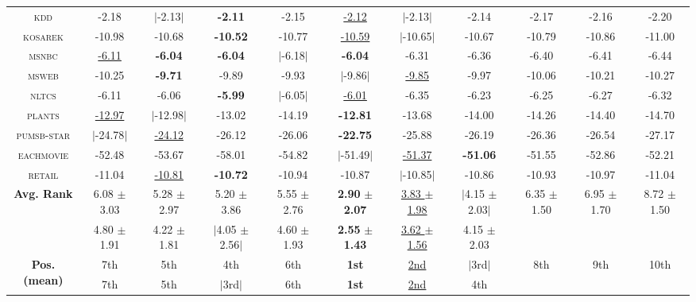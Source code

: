 \documentclass[14pt]{ffslides}
\newenvironment{vhcenterb}{\vspace*{\fill}\begin{center}}{\end{center}\vspace*{\fill}}
\begin{document}
\begin{vhcenterb}
{\begin{tabular}{c|ccccc|ccccc}
    \textsc{kdd       } & -2.18 & $|$-2.13$|$ & \textbf{-2.11} & -2.15 & \underline{-2.12} & $|$-2.13$|$ & -2.14 & -2.17 & -2.16 & -2.20\\
    \textsc{kosarek   } & -10.98 & -10.68 & \textbf{-10.52} & -10.77 & \underline{-10.59} & $|$-10.65$|$ & -10.67 & -10.79 & -10.86 & -11.00\\
    \textsc{msnbc     } & \underline{-6.11} & \textbf{-6.04} & \textbf{-6.04} & $|$-6.18$|$ & \textbf{-6.04} & -6.31 & -6.36 & -6.40 & -6.41 & -6.44\\
    \textsc{msweb     } & -10.25 & \textbf{-9.71} & -9.89 & -9.93 & $|$-9.86$|$ & \underline{-9.85} & -9.97 & -10.06 & -10.21 & -10.27\\
    \textsc{nltcs     } & -6.11 & -6.06 & \textbf{-5.99} & $|$-6.05$|$ & \underline{-6.01} & -6.35 & -6.23 & -6.25 & -6.27 & -6.32\\
    \textsc{plants    } & \underline{-12.97} & $|$-12.98$|$ & -13.02 & -14.19 & \textbf{-12.81} & -13.68 & -14.00 & -14.26 & -14.40 & -14.70\\
    \textsc{pumsb-star} & $|$-24.78$|$ & \underline{-24.12} & -26.12 & -26.06 & \textbf{-22.75} & -25.88 & -26.19 & -26.36 & -26.54 & -27.17\\
    \textsc{eachmovie } & -52.48 & -53.67 & -58.01 & -54.82 & $|$-51.49$|$ & \underline{-51.37} & \textbf{-51.06} & -51.55 & -52.86 & -52.21\\
    \textsc{retail    } & -11.04 & \underline{-10.81} & \textbf{-10.72} & -10.94 & -10.87 & $|$-10.85$|$ & -10.86 & -10.93 & -10.97 & -11.04\\
    \hline
    \multirow{2}{*}[-0.15em]{\textbf{Avg. Rank}} & 6.08 $\pm$ 3.03 & 5.28 $\pm$ 2.97 & 5.20 $\pm$ 3.86 & 5.55 $\pm$ 2.76 & \textbf{2.90} $\bm{\pm}$ \textbf{2.07} & \underline{3.83 $\pm$ 1.98} & $|$4.15 $\pm$ 2.03$|$ & 6.35 $\pm$ 1.50 & 6.95 $\pm$ 1.70 & 8.72 $\pm$ 1.50 \\
                                                 & 4.80 $\pm$ 1.91 & 4.22 $\pm$ 1.81 & $|$4.05 $\pm$ 2.56$|$ & 4.60 $\pm$ 1.93 & \textbf{2.55} $\bm{\pm}$ \textbf{1.43} & \underline{3.62 $\pm$ 1.56} & 4.15 $\pm$ 2.03 \\
    \hline
    \multirow{2}{*}[-0.15em]{\textbf{Pos. (mean)}} & 7th & 5th & 4th & 6th & \textbf{1st} & \underline{2nd} & $|$3rd$|$ & 8th & 9th & 10th \\
                                                   & 7th & 5th & $|$3rd$|$ & 6th & \textbf{1st} & \underline{2nd} & 4th \\
    \hline
  \end{tabular}
  }
\end{vhcenterb}

{\color{boxdgray}\cite{gens13,dang20,liang17,dimauro21,jaini18a}}

\end{document}
